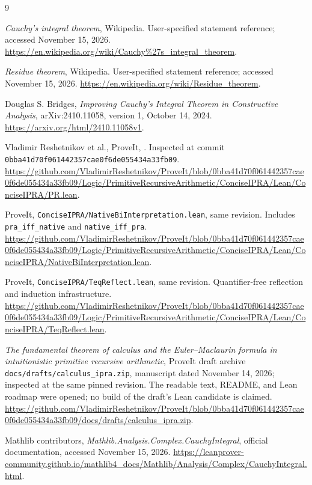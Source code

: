 \documentclass[11pt]{article}
\theoremstyle{definition}
\newcommand{\code}[1]{\texttt{#1}}
\begin{document}
\clearpage
\begin{thebibliography}{9}
\small\raggedright

\emph{Cauchy's integral theorem}, Wikipedia.
User-specified statement reference; accessed November 15, 2026.
\url{https://en.wikipedia.org/wiki/Cauchy%27s_integral_theorem}.

\emph{Residue theorem}, Wikipedia.
User-specified statement reference; accessed November 15, 2026.
\url{https://en.wikipedia.org/wiki/Residue_theorem}.

Douglas S. Bridges,
\emph{Improving Cauchy's Integral Theorem in Constructive Analysis},
arXiv:2410.11058, version 1, October 14, 2024.
\url{https://arxiv.org/html/2410.11058v1}.

Vladimir Reshetnikov et al., ProveIt,
.
Inspected at commit \code{0bba41d70f061442357cae0f6de055434a33fb09}.
\url{https://github.com/VladimirReshetnikov/ProveIt/blob/0bba41d70f061442357cae0f6de055434a33fb09/Logic/PrimitiveRecursiveArithmetic/ConciseIPRA/Lean/ConciseIPRA/PR.lean}.

ProveIt, \code{ConciseIPRA/NativeBiInterpretation.lean}, same revision.
Includes \code{pra\_iff\_native} and \code{native\_iff\_pra}.
\url{https://github.com/VladimirReshetnikov/ProveIt/blob/0bba41d70f061442357cae0f6de055434a33fb09/Logic/PrimitiveRecursiveArithmetic/ConciseIPRA/Lean/ConciseIPRA/NativeBiInterpretation.lean}.

ProveIt, \code{ConciseIPRA/TeqReflect.lean}, same revision.
Quantifier-free reflection and induction infrastructure.
\url{https://github.com/VladimirReshetnikov/ProveIt/blob/0bba41d70f061442357cae0f6de055434a33fb09/Logic/PrimitiveRecursiveArithmetic/ConciseIPRA/Lean/ConciseIPRA/TeqReflect.lean}.

\emph{The fundamental theorem of calculus and the Euler--Maclaurin formula
in intuitionistic primitive recursive arithmetic},
ProveIt draft archive \code{docs/drafts/calculus\_ipra.zip},
manuscript dated November 14, 2026; inspected at the same pinned revision.
The readable text, README, and Lean roadmap were opened; no build of the
draft's Lean candidate is claimed.
\url{https://github.com/VladimirReshetnikov/ProveIt/blob/0bba41d70f061442357cae0f6de055434a33fb09/docs/drafts/calculus_ipra.zip}.

Mathlib contributors,
\emph{Mathlib.Analysis.Complex.CauchyIntegral}, official documentation,
accessed November 15, 2026.
\url{https://leanprover-community.github.io/mathlib4_docs/Mathlib/Analysis/Complex/CauchyIntegral.html}.

\end{thebibliography}
\end{document}

